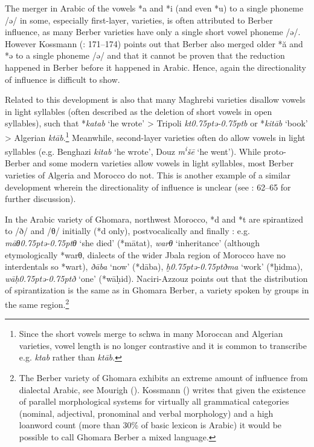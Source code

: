 \documentclass[output=paper]{langsci/langscibook}
\begin{document}
  The merger in Arabic of the vowels *{a} and *{i} (and even *{u}) to a single phoneme /ǝ/ in some, especially first-layer, varieties, is often attributed to Berber influence, as many Berber varieties have only a single short vowel phoneme /ǝ/. However Kossmann (\citeyear{Kossmann2013book}: 171–174) points out that Berber also merged older *ă and *ǝ to a single phoneme /ǝ/ and that it cannot be proven that the reduction happened in Berber before it happened in Arabic. Hence, again the directionality of influence is difficult to show.

  Related to this development is also that many Maghrebi varieties disallow vowels in light syllables (often described as the deletion of short vowels in open syllables), such that *\textit{katab} ‘he wrote’ > Tripoli \textit{kt\kern 0.75ptǝ\kern -0.75ptb} or *\textit{kitāb} ‘book’ > Algerian \textit{ktāb}.\footnote{Since the short vowels merge to schwa in many Moroccan and Algerian varieties, vowel length is no longer contrastive and it is common to transcribe e.g. \textit{ktab} rather than \textit{ktāb}.} Meanwhile, second-layer varieties often do allow vowels in light syllables (e.g. Benghazi \textit{kitab} ‘he wrote’, Douz \textit{m\textsuperscript{i}}\textit{šē} ‘he went’). While proto-Berber and some modern varieties allow vowels in light syllables, most Berber varieties of Algeria and Morocco do not. This is another example of a similar development wherein the directionality of influence is unclear (see \citealt{Souag2017syllable}: 62–65 for further discussion).

  In the Arabic variety of Ghomara, northwest Morocco, *d and *t are spirantized to /ð/ and /θ/ initially (*d only), postvocalically and finally \citep{Naciri-Azzouz2016}: e.g. \textit{māθ\kern 0.75ptǝ\kern -0.75ptθ} `she died' (*mātat), \textit{warθ} `inheritance' (although etymologically *warθ, dialects of the wider Jbala region of Morocco have no interdentals so *wart), \textit{ðāba} `now' (*dāba), \textit{ḫ\kern 0.75ptǝ\kern -0.75ptðma} `work' (*ḫidma), \textit{wāḥ\kern 0.75ptǝ\kern -0.75ptð} `one' (*wāḥid). Naciri-Azzouz points out that the distribution of spirantization is the same as in Ghomara Berber, a variety spoken by groups in the same region.\footnote{The Berber variety of Ghomara exhibits an extreme amount of influence from dialectal Arabic, see Mourigh (\citeyear{Mourigh2015}). Kossmann (\citeyear[431]{Kossmann2013book}) writes that given the existence of parallel morphological systems for virtually all grammatical categories (nominal, adjectival, pronominal and verbal morphology) and a high loanword count (more than 30\% of basic lexicon is Arabic) it would be possible to call Ghomara Berber a mixed language.}
\end{document}
